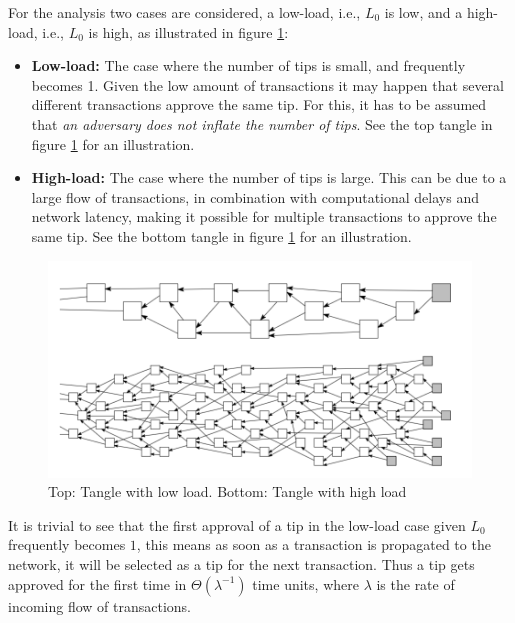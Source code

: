 For the analysis two cases are considered, a low-load, i.e., $L_0$ is low, and a high-load, i.e., $L_0$ is high, as illustrated in figure \ref{fig:iota-low-high-load}:
\begin{itemize}
    \item \textbf{Low-load: } The case where the number of tips is small, and frequently becomes 1. Given the low amount of transactions it may happen that several different transactions approve the same tip. For this, it has to be assumed that \emph{an adversary does not inflate the number of tips}. See the top tangle in figure \ref{fig:iota-low-high-load} for an illustration. 
    \item \textbf{High-load: } The case where the number of tips is large. This can be due to a large flow of transactions, in combination with computational delays and network latency, making it possible for multiple transactions to approve the same tip. See the bottom tangle in figure \ref{fig:iota-low-high-load} for an illustration. 
\end{itemize}

\begin{figure}[H]
    \centering
    \includegraphics[width=\linewidth]{images/iota-low-high-load.png}
    \caption{Top: Tangle with low load. Bottom: Tangle with high load}
    \label{fig:iota-low-high-load}
\end{figure}

It is trivial to see that the first approval of a tip in the low-load case given $L_0$ frequently becomes $1$, this means as soon as a transaction is propagated to the network, it will be selected as a tip for the next transaction. Thus a tip gets approved for the first time in $\Theta(\lambda^{-1})$ time units, where $\lambda$ is the rate of incoming flow of transactions.\\

